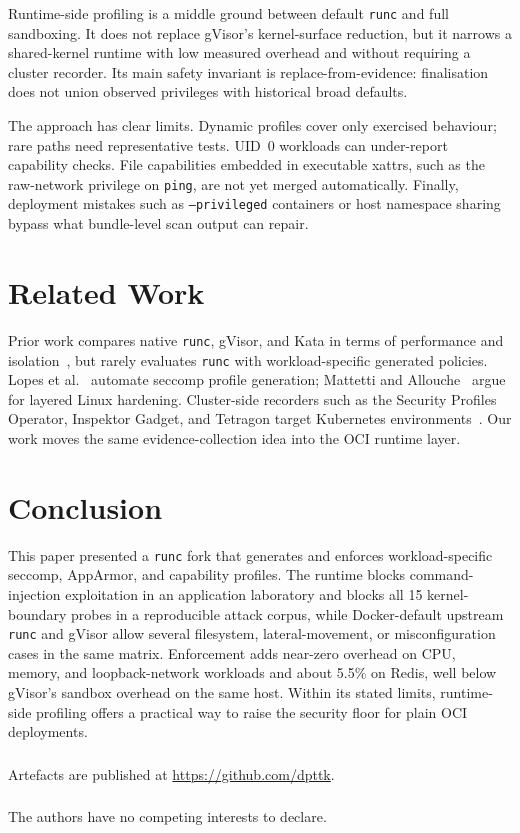 \documentclass[runningheads]{llncs}
\begin{document}
Runtime-side profiling is a middle ground between default \texttt{runc} and full sandboxing. It does not replace gVisor's kernel-surface reduction, but it narrows a shared-kernel runtime with low measured overhead and without requiring a cluster recorder. Its main safety invariant is replace-from-evidence: finalisation does not union observed privileges with historical broad defaults.

The approach has clear limits. Dynamic profiles cover only exercised behaviour; rare paths need representative tests. UID~0 workloads can under-report capability checks. File capabilities embedded in executable xattrs, such as the raw-network privilege on \texttt{ping}, are not yet merged automatically. Finally, deployment mistakes such as \texttt{--privileged} containers or host namespace sharing bypass what bundle-level scan output can repair.

\section{Related Work}\label{sec:related}

Prior work compares native \texttt{runc}, gVisor, and Kata in terms of performance and isolation~\cite{wang2022,viktorsson2020,volpert2024}, but rarely evaluates \texttt{runc} with workload-specific generated policies. Lopes et al.~\cite{lopes2020} automate seccomp profile generation; Mattetti and Allouche~\cite{mattetti2020} argue for layered Linux hardening. Cluster-side recorders such as the Security Profiles Operator, Inspektor Gadget, and Tetragon target Kubernetes environments~\cite{spo2025,inspektorgadget2025,tetragon2025}. Our work moves the same evidence-collection idea into the OCI runtime layer.

\section{Conclusion}\label{sec:conclusion}

This paper presented a \texttt{runc} fork that generates and enforces workload-specific seccomp, AppArmor, and capability profiles. The runtime blocks command-injection exploitation in an application laboratory and blocks all 15 kernel-boundary probes in a reproducible attack corpus, while Docker-default upstream \texttt{runc} and gVisor allow several filesystem, lateral-movement, or misconfiguration cases in the same matrix. Enforcement adds near-zero overhead on CPU, memory, and loopback-network workloads and about 5.5\% on Redis, well below gVisor's sandbox overhead on the same host. Within its stated limits, runtime-side profiling offers a practical way to raise the security floor for plain OCI deployments.

\begin{credits}
\subsubsection{\ackname} Artefacts are published at \url{https://github.com/dpttk}.

\subsubsection{\discintname} The authors have no competing interests to declare.
\end{credits}



\end{document}
